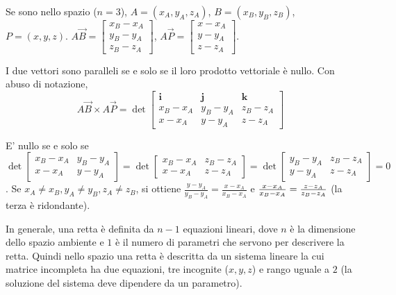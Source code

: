 \documentclass{article}
\begin{document}
Se sono nello spazio ($n=3$), $A=\left( x_{A},y_{A},z_{A}\right) $, $%
B=\left( x_{B},y_{B},z_{B}\right) $, $P=\left( x,y,z\right) $. $A\vec{B}=%
\left[ 
\begin{array}{c}
x_{B}-x_{A} \\ 
y_{B}-y_{A} \\ 
z_{B}-z_{A}%
\end{array}%
\right] $, $A\vec{P}=\left[ 
\begin{array}{c}
x-x_{A} \\ 
y-y_{A} \\ 
z-z_{A}%
\end{array}%
\right] $.

I due vettori sono paralleli se e solo se il loro prodotto vettoriale \`{e}
nullo. Con abuso di notazione,%
\begin{equation*}
A\vec{B}\times A\vec{P}=\det \left[ 
\begin{array}{ccc}
\mathbf{i} & \mathbf{j} & \mathbf{k} \\ 
x_{B}-x_{A} & y_{B}-y_{A} & z_{B}-z_{A} \\ 
x-x_{A} & y-y_{A} & z-z_{A}%
\end{array}%
\right]
\end{equation*}

E' nullo se e solo se $\det \left[ 
\begin{array}{cc}
x_{B}-x_{A} & y_{B}-y_{A} \\ 
x-x_{A} & y-y_{A}%
\end{array}%
\right] =\det \left[ 
\begin{array}{cc}
x_{B}-x_{A} & z_{B}-z_{A} \\ 
x-x_{A} & z-z_{A}%
\end{array}%
\right] =\det \left[ 
\begin{array}{cc}
y_{B}-y_{A} & z_{B}-z_{A} \\ 
y-y_{A} & z-z_{A}%
\end{array}%
\right] =0$. Se $x_{A}\neq x_{B},y_{A}\neq y_{B},z_{A}\neq z_{B}$, si
ottiene $\frac{y-y_{A}}{y_{B}-y_{A}}=\frac{x-x_{A}}{x_{B}-x_{A}}$ e $\frac{%
x-x_{A}}{x_{B}-x_{A}}=\frac{z-z_{A}}{z_{B}-z_{A}}$ (la terza \`{e}
ridondante).

In generale, una retta \`{e} definita da $n-1$ equazioni lineari, dove $n$ 
\`{e} la dimensione dello spazio ambiente e $1$ \`{e} il numero di parametri
che servono per descrivere la retta. Quindi nello spazio una retta \`{e}
descritta da un sistema lineare la cui matrice incompleta ha due equazioni,
tre incognite ($x,y,z$) e rango uguale a $2$ (la soluzione del sistema deve
dipendere da un parametro).
\end{document}

